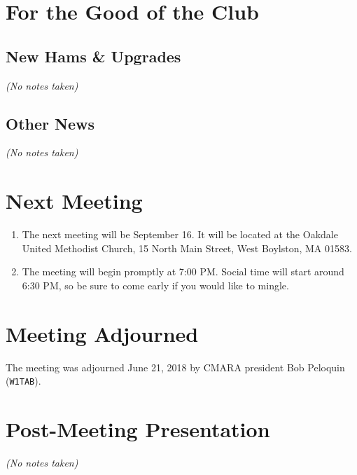 \documentclass[10pt,letterpaper]{article}
\begin{document}
\section{For the Good of the Club}

\subsection{New Hams \& Upgrades}
\emph{(No notes taken)}

\subsection{Other News}
\emph{(No notes taken)}

\section{Next Meeting}
\begin{enumerate}
  \item The next meeting will be September 16. It will be located at the Oakdale United Methodist Church, 15 North Main Street, West Boylston, MA 01583.
  \item The meeting will begin promptly at 7:00 PM. Social time will start around 6:30 PM, so be sure to come early if you would like to mingle.
\end{enumerate}

\section{Meeting Adjourned}
The meeting was adjourned June 21, 2018 by CMARA president Bob Peloquin (\texttt{W1TAB}).

\section{Post-Meeting Presentation}
\emph{(No notes taken)}
\end{document}
